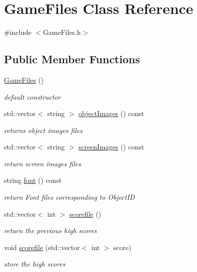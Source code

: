 \hypertarget{class_game_files}{}\section{Game\+Files Class Reference}
\label{class_game_files}


{\ttfamily \#include $<$Game\+Files.\+h$>$}

\subsection*{Public Member Functions}
\begin{DoxyCompactItemize}
\item 
\mbox{\label{class_game_files_a6e807d5e0b75fd7bf66a5bcc83e808d1}} 
\mbox{\hyperlink{class_game_files_a6e807d5e0b75fd7bf66a5bcc83e808d1}{Game\+Files}} ()
\begin{DoxyCompactList}\small\item\em default constructor \end{DoxyCompactList}\item 
std\+::vector$<$ string $>$ \mbox{\hyperlink{class_game_files_a44e04f4099034508077b8facfb99b829}{object\+Images}} () const
\begin{DoxyCompactList}\small\item\em returns object images files \end{DoxyCompactList}\item 
std\+::vector$<$ string $>$ \mbox{\hyperlink{class_game_files_a62b2640ebb37c6c5e68ca7c369955b90}{screen\+Images}} () const
\begin{DoxyCompactList}\small\item\em return screen images files \end{DoxyCompactList}\item 
string \mbox{\hyperlink{class_game_files_ac9c59e01a8a7a5ea98852fb69a76bd1e}{font}} () const
\begin{DoxyCompactList}\small\item\em return Font files corresponding to Object\+ID \end{DoxyCompactList}\item 
std\+::vector$<$ int $>$ \mbox{\hyperlink{class_game_files_a101acdcafdb5ba63e9a1d1358f097f73}{scorefile}} ()
\begin{DoxyCompactList}\small\item\em return the previous high scores \end{DoxyCompactList}\item 
void \mbox{\hyperlink{class_game_files_a458d9d639a6e93a8fd8c50979b6a8f7f}{scorefile}} (std\+::vector$<$ int $>$ score)
\begin{DoxyCompactList}\small\item\em store the high scores \end{DoxyCompactList}\end{DoxyCompactItemize}
